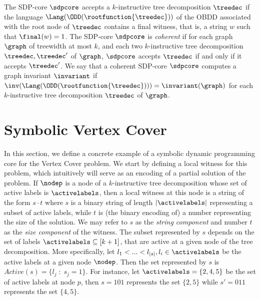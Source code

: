The SDP-core $\sdpcore$ accepts a $k$-instructive tree decomposition  $\treedec$ if the language $\Lang(\ODD(\rootfunction{\treedec}))$ of the OBDD associated with the root node of $\treedec$ contains a final witness, 
that is, a string $w$ such that $\final(w)=1$. The SDP-core $\sdpcore$ is {\em coherent} if for 
each graph $\graph$ of treewidth at most $k$, and each two $k$-instructive tree 
decomposition $\treedec,\treedec'$ of $\graph$, $\sdpcore$ accepts $\treedec$ if and only if 
it accepts $\treedec'$. We say that a coherent SDP-core $\sdpcore$ computes a graph invariant 
$\invariant$ if $\inv(\Lang(\ODD(\rootfunction{\treedec}))) = \invariant(\graph)$ for each $k$-instructive tree decomposition $\treedec$ of $\graph$. 


\section{Symbolic Vertex Cover}\label{Symbolic Vertex Cover (sketch)}

In this section, we define a concrete example of a symbolic dynamic programming core for the {\sc Vertex Cover} problem. We start by defining a local witness for this problem, which intuitively will serve as an encoding of a partial solution of the problem. 
If $\nodep$ is a node of a $k$-instructive tree decomposition whose set of active labels is $\activelabels$, then a local witness at this node is a string of the form $s\cdot t$ where $s$ is a binary string of length $|\activelabels|$ representing a subset of active labels, while $t$ is (the binary encoding of) a number representing the size of the solution. We may refer to $s$ as the \textit{string component} and number $t$ as the \textit{size component} of the witness. The subset represented by $s$ depends on the set of labels $\activelabels \subseteq [k+1]$, that are active at a given node of the tree decomposition. More specifically, let $l_1 < ... < l_{|s|}, l_i \in \activelabels$ be the active labels at a given node $\nodep$. Then the set represented by $s$ is $Active(s) = \{l_j \;:\; s_j=1\}$. For instance, let
$\activelabels = \{2,4,5\}$ be the set of active labels at node $p$, then $s=101$ represents the set $\{2,5\}$ while $s'=011$ represents the set $\{4,5\}$. 

